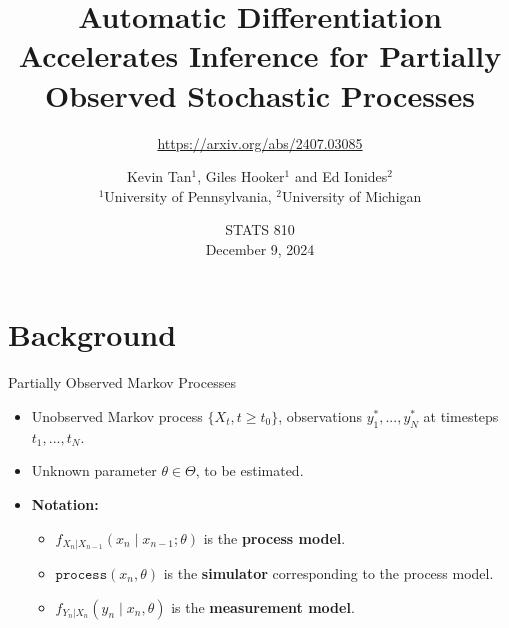 \documentclass{beamer}
\title[AD for POMPs]{Automatic Differentiation Accelerates Inference for Partially Observed Stochastic Processes}
\subtitle{\url{https://arxiv.org/abs/2407.03085}}
\author[Tan, Hooker \& Ionides]{Kevin Tan$^1$, Giles Hooker$^1$ and Ed Ionides$^2$ \\ {\small $^1$University of Pennsylvania, $^2$University of Michigan}}
\date[STATS 810]{STATS 810 \\December 9, 2024}
\begin{document}
\maketitle


\section{Background}


\begin{frame}{Partially Observed Markov Processes}

    \begin{itemize}
        \item Unobserved Markov process $\{X_t, t \geq t_0\}$, observations $y_1^*,...,y_N^*$ at timesteps $t_1,..., t_N$.
        \item \pause Unknown parameter $\theta \in \Theta$, to be estimated.
        \item \textbf{Notation:}
        \begin{itemize}
            \item $f_{X_n|X_{n-1}}\left(x_{n} \mid x_{n-1}; \theta\right)$ is the \textbf{process model}.
            \item \pause $\texttt{process}\left(x_n, \theta\right)$ is the \textbf{simulator} corresponding to the process model. 
            \item \pause $f_{Y_n|X_n}\left(y_n \mid x_n, \theta\right)$ is the \textbf{measurement model}.
        \end{itemize}
    \end{itemize}
\end{frame}
\end{document}
